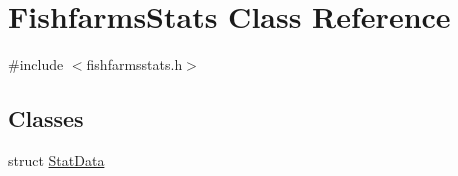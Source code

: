\hypertarget{class_fishfarms_stats}{}\section{Fishfarms\+Stats Class Reference}
\label{class_fishfarms_stats}


{\ttfamily \#include $<$fishfarmsstats.\+h$>$}

\subsection*{Classes}
\begin{DoxyCompactItemize}
\item 
struct \mbox{\hyperlink{struct_fishfarms_stats_1_1_stat_data}{Stat\+Data}}
\end{DoxyCompactItemize}
